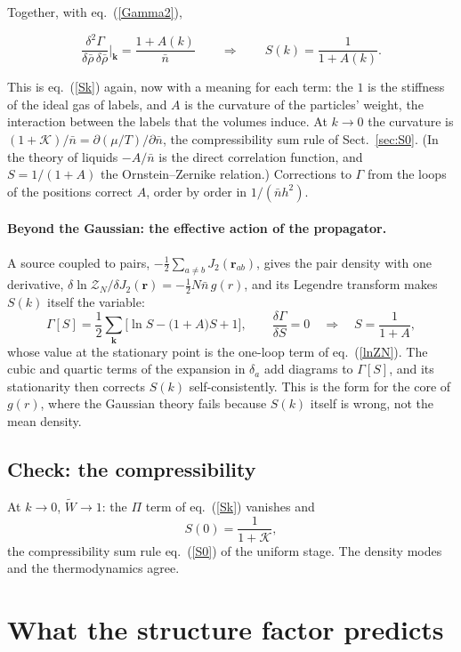 \documentclass[11pt,aps,preprint,nofootinbib,superscriptaddress,tightenlines]{revtex4-2}
\def\st{\begin{equation}}
\def\stp{\end{equation}}
\def\Eq#1{eq.~(\ref{#1})}
\def\Sect#1{Sect.~\ref{#1}}
\let\oldparagraph\paragraph
\renewcommand{\paragraph}{\par\bigskip\oldparagraph}
\begin{document}
Together, with \Eq{Gamma2},
\begin{keyeq}
\st
\frac{\delta^2\Gamma}{\delta\bar\rho\,\delta\bar\rho}\bigg|_{\bm k}=\frac{1+A(k)}{\bar n}\qquad\Longrightarrow\qquad S(k)=\frac1{1+A(k)} .
\stp
\end{keyeq}
This is \Eq{Sk} again, now with a meaning for each term: the $1$ is the stiffness of the ideal gas of labels, and $A$ is the curvature of the particles'
weight, the interaction between the labels that the volumes induce.  At $k\to0$ the curvature is $(1+\mathcal K)/\bar n=\partial(\mu/T)/\partial\bar n$, the
compressibility sum rule of \Sect{sec:S0}.  (In the theory of liquids $-A/\bar n$ is the direct correlation function, and $S=1/(1+A)$ the Ornstein--Zernike
relation.)  Corrections to $\Gamma$ from the loops of the positions correct $A$, order by order in $1/(\bar nh^2)$.

\paragraph{Beyond the Gaussian: the effective action of the propagator.}  A source coupled to pairs, $-\tfrac12\sum_{a\neq b}J_2(\bm r_{ab})$, gives the pair
density with one derivative, $\delta\ln\mathcal Z_N/\delta J_2(\bm r)=-\tfrac12N\bar n\,g(r)$, and its Legendre transform makes $S(k)$ itself the variable:
\st
\Gamma[S]=\frac12\sum_{\bm k}\Big[\ln S-\big(1+A\big)S+1\Big],\qquad \frac{\delta\Gamma}{\delta S}=0\quad\Longrightarrow\quad S=\frac1{1+A},
\stp
whose value at the stationary point is the one-loop term of \Eq{lnZN}.  The cubic and quartic terms of the expansion in $\delta_a$ add diagrams to $\Gamma[S]$,
and its stationarity then corrects $S(k)$ self-consistently.  This is the form for the core of $g(r)$, where the Gaussian theory fails because $S(k)$ itself is
wrong, not the mean density.

\subsection{Check: the compressibility}
\label{sec:S0check}

At $k\to0$, $\widetilde W\to1$: the $\Pi$ term of \Eq{Sk} vanishes and
\st
S(0)=\frac1{1+\mathcal K},
\stp
the compressibility sum rule \Eq{S0} of the uniform stage.  The density modes and the thermodynamics agree.

\section{What the structure factor predicts}
\label{sec:predict}
\end{document}
